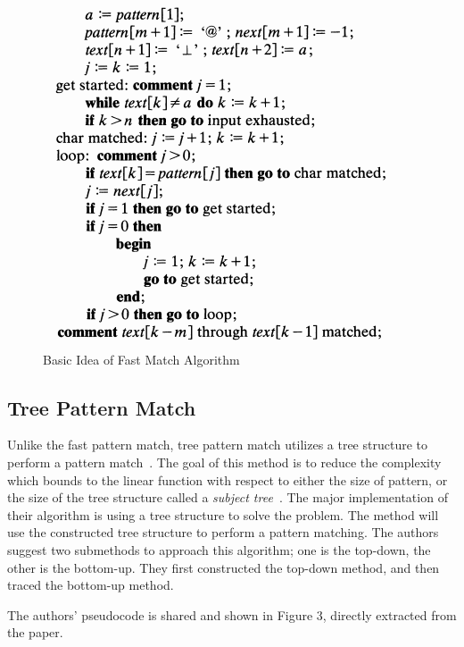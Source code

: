 \documentclass{acm_proc_article-sp}
\begin{document}
\begin{figure}
  \includegraphics[scale=.7]{fastpattern01}
  \caption{Basic Idea of Fast Match Algorithm~\cite{Fast}}
\end{figure}

\subsection{Tree Pattern Match}
\begin{flushleft}
Unlike the fast pattern match, tree pattern match utilizes a tree structure to perform a pattern match~\cite{Tree}. The goal of this method is to reduce the complexity which bounds to the linear function with respect to either the size of pattern, or the size of the tree structure called a \textit{subject tree}~\cite{Tree}. The major implementation of their algorithm is using a tree structure to solve the problem. The method will use the constructed tree structure to perform a pattern matching. The authors suggest two submethods to approach this algorithm; one is the top-down, the other is the bottom-up. They first constructed the top-down method, and then traced the bottom-up method.

The authors' pseudocode is shared and shown in Figure 3, directly extracted from the paper.
\end{flushleft}
\end{document}
